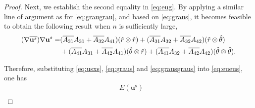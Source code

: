 \documentclass[11pt,reqno,twoside]{amsart}
\theoremstyle{definition}
\theoremstyle{remark}
\numberwithin{equation}{section}
\newcommand{\bu}{\mathbf{u}}
\newcommand{\bx}{\mathbf{x}}
\begin{document}
\begin{proof}
				Next, we establish the second equality in \eqref{eq:eug}.
				By applying a similar line of argument as for \eqref{eq:graugrau}, and based on \eqref{eq:graus}, it becomes feasible to obtain the following result when $n$ is sufficiently large,
				\begin{align}\label{eq:grausgraus}
					(\nabla \overline{\bu^{s}} )\nabla \bu^{s}
					=&(\overline{A_{31} }A_{31}+\overline{A_{32} }A_{41}) (\hat{r} \otimes \hat{r })+(\overline{A_{31} }A_{32}+\overline{A_{32} }A_{42} ) (\hat{r} \otimes \hat{\theta })\\
					&+(\overline{A_{41} }A_{31} +\overline{A_{42} }A_{41} )(\hat{\theta} \otimes \hat{r })+(\overline{A_{41} }A_{32} +\overline{A_{42} }A_{42})(\hat{\theta} \otimes \hat{\theta}).\notag
				\end{align}

				Therefore, substituting \eqref{eq:usxs}, \eqref{eq:graus} and \eqref{eq:grausgraus} into \eqref{eq:eueus}, one has 
				\begin{align}\label{eq:euzs}
					&E(\mathbf{u^{s}})\\

\end{align}
\end{proof}
\end{document}
